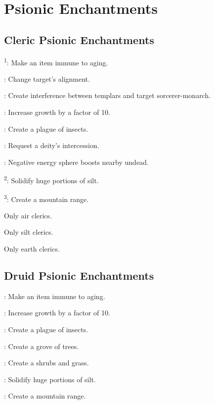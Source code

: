 \section{Psionic Enchantments}



\subsection{Cleric Psionic Enchantments}

\textsuperscript{1}: Make an item immune to aging.

: Change target's alignment.

: Create interference between templars and target sorcerer-monarch.

: Increase growth by a factor of 10.

: Create a plague of insects.

: Request a deity's intercession.

: Negative energy sphere boosts nearby undead.

\textsuperscript{2}: Solidify huge portions of silt.

\textsuperscript{3}: Create a mountain range.

 Only air clerics.

 Only silt clerics.

 Only earth clerics.



\subsection{Druid Psionic Enchantments}

: Make an item immune to aging.

: Increase growth by a factor of 10.

: Create a plague of insects.

: Create a grove of trees.

: Create a shrubs and grass.

: Solidify huge portions of silt.

: Create a mountain range.



